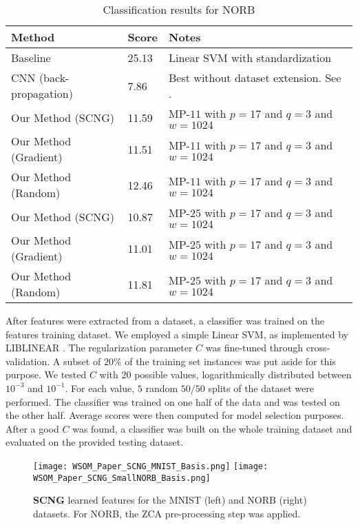 \documentclass[runningheads,a4paper]{llncs}
\begin{document}
\renewcommand{\arraystretch}{1.2}
\begin{table}
  \caption{Classification results for NORB}
  \label{table:ResultsNORB}
  \begin{tabularx}{\textwidth}{|l|l|X|}
    \hline
    \textbf{Method} & \textbf{Score} & \textbf{Notes} \\ \hline\hline
    Baseline & 25.13 & Linear SVM with standardization \\ \hline
    CNN (back-propagation) & 7.86 & Best without dataset extension. See \cite{high-performance-neural-networks-visual-classification}. \\ \hline
    Our Method (SCNG) & 11.59 & MP-$11$ with $p=17$ and $q=3$ and $w=1024$ \\ \hline
    Our Method (Gradient) & 11.51 & MP-$11$ with $p=17$ and $q=3$ and $w=1024$ \\ \hline
    Our Method (Random) & 12.46 & MP-$11$ with $p=17$ and $q=3$ and $w=1024$ \\ \hline
    Our Method (SCNG) & 10.87 & MP-$25$ with $p=17$ and $q=3$ and $w=1024$ \\ \hline
    Our Method (Gradient) & 11.01 & MP-$25$ with $p=17$ and $q=3$ and $w=1024$ \\ \hline
    Our Method (Random) & 11.81 & MP-$25$ with $p=17$ and $q=3$ and $w=1024$ \\ \hline
  \end{tabularx}
\end{table}
\renewcommand{\arraystretch}{1.0}

After features were extracted from a dataset, a classifier was trained on the features training dataset. We employed a simple Linear SVM, as implemented by LIBLINEAR \cite{liblinear}. The regularization parameter $C$ was fine-tuned through cross-validation. A subset of $20\%$ of the training set instances was put aside for this purpose. We tested $C$ with $20$ possible values, logarithmically distributed between $10^{-3}$ and $10^{-1}$. For each value, $5$ random $50/50$ splits of the dataset were performed. The classifier was trained on one half of the data and was tested on the other half. Average scores were then computed for model selection purposes. After a good $C$ was found, a classifier was built on the whole training dataset and evaluated on the provided testing dataset.

\begin{figure}
\centering
\texttt{[image: WSOM\_Paper\_SCNG\_MNIST\_Basis.png]}
\texttt{[image: WSOM\_Paper\_SCNG\_SmallNORB\_Basis.png]}
\caption{\textbf{SCNG} learned features for the MNIST (left) and NORB (right) datasets. For NORB, the ZCA pre-processing step was applied.}
\label{fig:LearnedFigures}
\end{figure}
\end{document}
